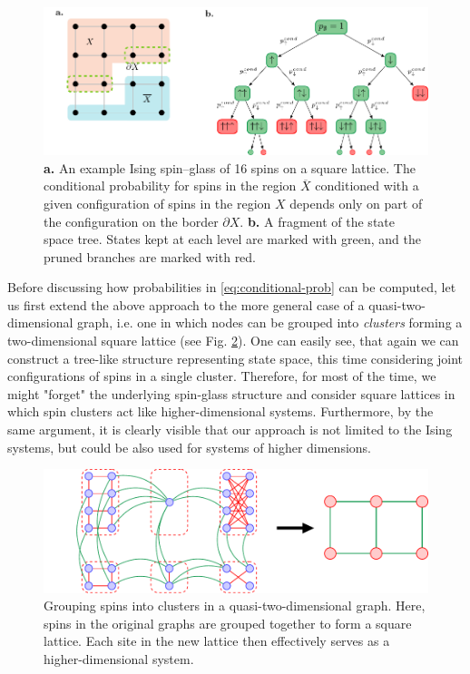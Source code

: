 \begin{figure}
  \centering
  \includegraphics[width=\textwidth]{figures/squarelattice.pdf}
  \caption{\textbf{a.} An example Ising spin--glass  of 16 spins on a square lattice. The conditional probability for spins in the region $\overline{X}$ conditioned with a given configuration of spins in the region $X$ depends only on part of the configuration on the border $\partial X$. \textbf{b.} A fragment of the state space tree. States kept at each
    level are marked with green, and the pruned branches are marked with red.}
  \label{fig:lattice-and-border}
\end{figure}

Before discussing how probabilities in \eqref{eq:conditional-prob} can be
computed, let us first extend the above approach to the more general case of a
quasi-two-dimensional graph, i.e. one in which nodes can be grouped into
\emph{clusters} forming a two-dimensional square lattice (see Fig.
\ref{fig:clustering}). One can easily see, that again we can construct a
tree-like structure representing state space, this time considering joint
configurations of spins in a single cluster. Therefore, for most of the time,
we might "forget" the underlying spin-glass structure and consider square
lattices in which spin clusters act like higher-dimensional systems.
Furthermore, by the same argument, it is clearly visible that our approach is
not limited to the Ising systems, but could be also used for systems of higher
dimensions.

\begin{figure}
  \includegraphics[width=\textwidth]{figures/clustering}
  \caption{Grouping spins into clusters in a quasi-two-dimensional graph. Here, spins in
    the original graphs are grouped together to form a square lattice. Each site in
    the new lattice then effectively serves as a higher-dimensional system.}
  \label{fig:clustering}
\end{figure}

